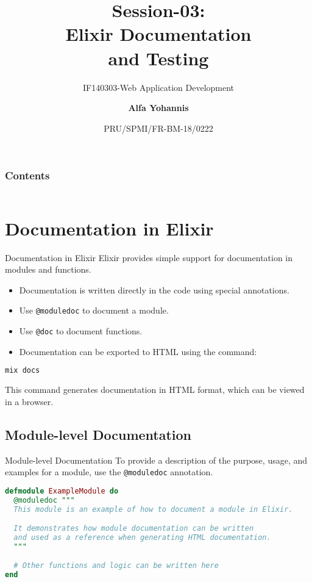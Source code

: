 \documentclass[aspectratio=169, table]{beamer}
\subtitle{IF140303-Web Application Development}
\title{Session-03:\\
\Huge{
Elixir Documentation\\
\vspace{10pt}
and Testing
\vspace{-20pt}
}
}
\date[Serial]{\scriptsize{PRU/SPMI/FR-BM-18/0222}}
\author[Pradita]{\small{\textbf{Alfa Yohannis}}}
\begin{document}
	
	\frame{\titlepage}
	
		\begin{frame}[fragile]
		\frametitle{Contents}
		\vspace{20pt}
		\begin{columns}[t]
			\tableofcontents[sections={1-3}]
			
			\tableofcontents[sections={4-6}]
		\end{columns}
	\end{frame}

\section{Documentation in Elixir}

\begin{frame}[fragile]{Documentation in Elixir}
\vspace{15pt}
Elixir provides simple support for documentation in modules and functions.  
\begin{itemize}
  \item Documentation is written directly in the code using special annotations.  
  \item Use \texttt{@moduledoc} to document a module.  
  \item Use \texttt{@doc} to document functions.  
  \item Documentation can be exported to HTML using the command:
\end{itemize}

\begin{lstlisting}[language=bash]
mix docs
\end{lstlisting}

This command generates documentation in HTML format, which can be viewed in a browser.
\end{frame}


\subsection{Module-level Documentation}

\begin{frame}[fragile]{Module-level Documentation}
\vspace{15pt}
To provide a description of the purpose, usage,  
and examples for a module, use the \texttt{@moduledoc} annotation.  

\begin{lstlisting}[language=Elixir]
defmodule ExampleModule do
  @moduledoc """
  This module is an example of how to document a module in Elixir.

  It demonstrates how module documentation can be written
  and used as a reference when generating HTML documentation.
  """

  # Other functions and logic can be written here
end
\end{lstlisting}

\end{frame}
\end{document}
